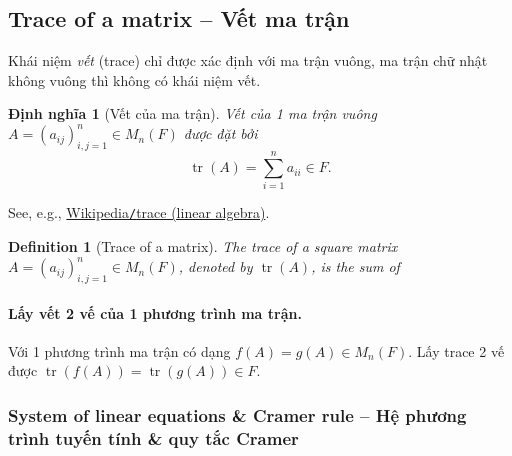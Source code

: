 \documentclass{article}
\newtheorem{definition}{Definition}
\newtheorem{dinhnghia}{Định nghĩa}
\begin{document}

\subsection{Trace of a matrix -- Vết ma trận}
Khái niệm {\it vết} (trace) chỉ được xác định với ma trận vuông, ma trận chữ nhật không vuông thì không có khái niệm vết.

\begin{dinhnghia}[Vết của ma trận]
	{\rm Vết} của 1 ma trận vuông $A = (a_{ij})_{i,j=1}^n\in M_n(F)$ được đặt bởi
	\begin{equation*}
		\operatorname{tr}(A) = \sum_{i=1}^n a_{ii}\in F.
	\end{equation*}
\end{dinhnghia}
See, e.g., \href{https://en.wikipedia.org/wiki/Trace_(linear_algebra)}{Wikipedia{\tt/}trace (linear algebra)}.

\begin{definition}[Trace of a matrix]
	The {\rm trace} of a square matrix $A = (a_{ij})_{i,j=1}^n\in M_n(F)$, denoted by $\operatorname{tr}(A)$, is the sum of
\end{definition}

\paragraph{Lấy vết 2 vế của 1 phương trình ma trận.} Với 1 phương trình ma trận có dạng $f(A) = g(A)\in M_n(F)$. Lấy trace 2 vế được $\operatorname{tr}(f(A)) = \operatorname{tr}(g(A))\in F$.



\subsubsection{System of linear equations \& Cramer rule -- Hệ phương trình tuyến tính \& quy tắc Cramer}
\end{document}
